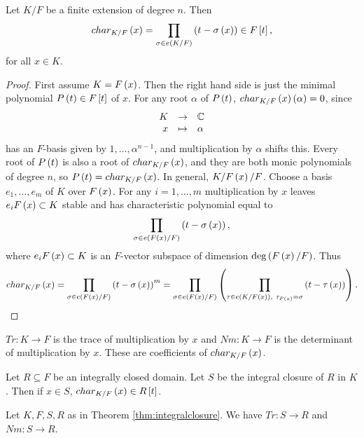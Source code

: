 \begin{proposition}
Let $ K / F $ be a finite extension of degree $ n $. Then
$$ char_{K / F}\left( x \right) = \prod_{\sigma \in e\left( K / F \right)} \left( t - \sigma\left( x \right) \right) \in F\left[ t \right], $$
for all $ x \in K $.
\end{proposition}

\begin{proof}
First assume $ K = F\left( x \right) $. Then the right hand side is just the minimal polynomial $ P\left( t \right) \in F\left[ t \right] $ of $ x $. For any root $ \alpha $ of $ P\left( t \right) $, $ char_{K / F}\left( x \right)\left( \alpha \right) = 0 $, since
$$ \function{K}{\C}{x}{\alpha} $$
has an $ F $-basis given by $ 1, \dots, \alpha^{n - 1} $, and multiplication by $ \alpha $ shifts this. Every root of $ P\left( t \right) $ is also a root of $ char_{K / F}\left( x \right) $, and they are both monic polynomials of degree $ n $, so $ P\left( t \right) = char_{K / F}\left( x \right) $. In general, $ K / F\left( x \right) / F $. Choose a basis $ e_1, \dots, e_m $ of $ K $ over $ F\left( x \right) $. For any $ i = 1, \dots, m $ multiplication by $ x $ leaves $ e_iF\left( x \right) \subset K $ stable and has characteristic polynomial equal to
$$ \prod_{\sigma \in e\left( F\left( x \right) / F \right)} \left( t - \sigma\left( x \right) \right), $$
where $ e_iF\left( x \right) \subset K $ is an $ F $-vector subspace of dimension $ \deg\left( F\left( x \right) / F \right) $. Thus
$$ char_{K / F}\left( x \right) = \prod_{\sigma \in e\left( F\left( x \right) / F \right)} \left( t - \sigma\left( x \right) \right)^m = \prod_{\sigma \in e\left( F\left( x \right) / F \right)} \left( \prod_{\tau \in e\left( K / F\left( x \right) \right), \ \tau_{F\left( x \right)} = \sigma} \left( t - \tau\left( x \right) \right) \right). $$
\end{proof}


\begin{definition}
$ Tr : K \to F $ is the trace of multiplication by $ x $ and $ Nm : K \to F $ is the determinant of multiplication by $ x $. These are coefficients of $ char_{K / F}\left( x \right) $.
\end{definition}

\begin{theorem}
\label{thm:integralclosure}
Let $ R \subseteq F $ be an integrally closed domain. Let $ S $ be the integral closure of $ R $ in $ K $. Then if $ x \in S $, $ char_{K / F}\left( x \right) \in R\left[ t \right] $.
\end{theorem}

\begin{corollary}
Let $ K, F, S, R $ as in Theorem \ref{thm:integralclosure}. We have $ Tr : S \to R $ and $ Nm : S \to R $.
\end{corollary}

